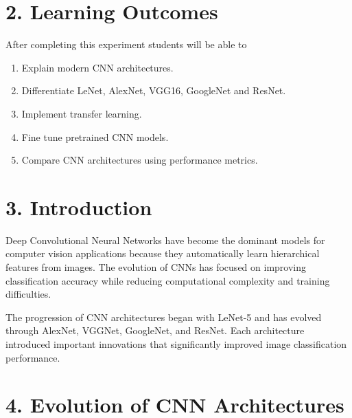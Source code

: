 \documentclass[11pt]{article}
\begin{document}

\section*{2. Learning Outcomes}

After completing this experiment students will be able to

\begin{enumerate}

\item Explain modern CNN architectures.

\item Differentiate LeNet, AlexNet, VGG16, GoogleNet and ResNet.

\item Implement transfer learning.

\item Fine tune pretrained CNN models.

\item Compare CNN architectures using performance metrics.

\end{enumerate}


\section*{3. Introduction}

Deep Convolutional Neural Networks have become the dominant models for
computer vision applications because they automatically learn hierarchical
features from images. The evolution of CNNs has focused on improving
classification accuracy while reducing computational complexity and
training difficulties.

The progression of CNN architectures began with LeNet-5 and has evolved
through AlexNet, VGGNet, GoogleNet, and ResNet. Each architecture
introduced important innovations that significantly improved image
classification performance.


\section*{4. Evolution of CNN Architectures}
\end{document}
